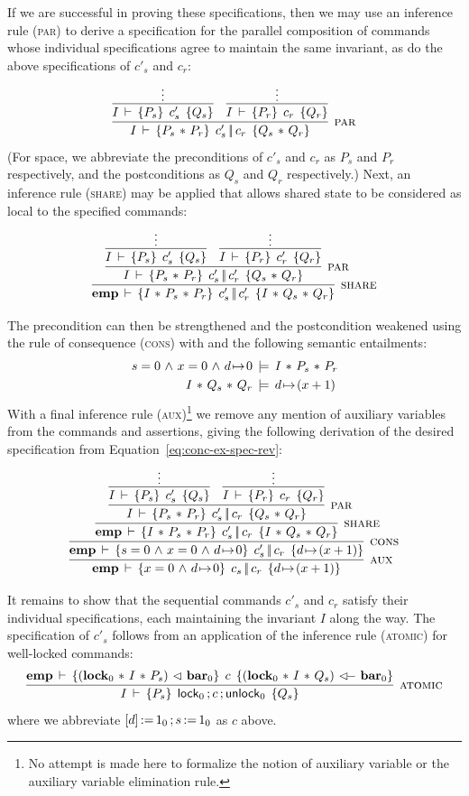 \documentclass[11pt]{report}
\begin{document}
If we are successful in proving these specifications, then we may use an inference rule (\textsc{par}) to derive a specification for the parallel composition of commands whose individual specifications agree to maintain the same invariant, as do the above specifications of $c'_s$ and $c_r$: \[ \infer[\textsc{par}]{\spec{I}{P_s \fsep P_r}{c'_s \oppar c_r}{Q_s \fsep Q_r}}{ \infer{\spec{I}{P_s}{c'_s}{Q_s}}{\vdots} & \infer{\spec{I}{P_r}{c_r}{Q_r}}{\vdots} }\] (For space, we abbreviate the preconditions of $c'_s$ and $c_r$ as $P_s$ and $P_r$ respectively, and the postconditions as $Q_s$ and $Q_r$ respectively.) Next, an inference rule (\textsc{share}) may be applied that allows shared state to be considered as local to the specified commands: \[ \infer[\textsc{share}]{ \spec{\femp}{I \fsep P_s \fsep P_r}{c'_s \oppar c'_r}{I \fsep Q_s \fsep Q_r} }{\infer[\textsc{par}]{\spec{I}{P_s \fsep P_r}{c'_s \oppar c'_r}{Q_s \fsep Q_r}}{ \infer{\spec{I}{P_s}{c'_s}{Q_s}}{\vdots} & \infer{\spec{I}{P_r}{c'_r}{Q_r}}{\vdots} }}\]

The precondition can then be strengthened and the postcondition weakened using the rule of consequence (\textsc{cons}) with and the following semantic entailments: \begin{align*}
s = 0 \operatorname{\,\wedge\,} x = 0 \operatorname{\,\wedge\,} d \!\mapsto\! 0 & \,\models\, I \operatorname{\,\ast\,} P_s \operatorname{\,\ast\,} P_r \\ 
I \operatorname{\,\ast\,} Q_s \operatorname{\,\ast\,} Q_r & \,\models\, d \!\mapsto\! (x + 1)
\end{align*} With a final inference rule (\textsc{aux})\footnote{No attempt is made here to formalize the notion of auxiliary variable or the auxiliary variable elimination rule.} we remove any mention of auxiliary variables from the commands and assertions, giving the following derivation of the desired specification from Equation~\ref{eq:conc-ex-spec-rev}: 
\[ \infer[\textsc{aux}]{ \spec{\femp}{x = 0 \conj d \fpointsto 0}{c_s \oppar c_r}{d \fpointsto (x+1)} }{\infer[\textsc{cons}]{ \spec{\femp}{s = 0 \conj x = 0 \conj d \fpointsto 0}{c'_s \oppar c_r}{d \fpointsto (x+1)} }{\infer[\textsc{share}]{ \spec{\femp}{I \fsep P_s \fsep P_r}{c'_s \oppar c_r}{I \fsep Q_s \fsep Q_r} }{\infer[\textsc{par}]{\spec{I}{P_s \fsep P_r}{c'_s \oppar c_r}{Q_s \fsep Q_r}}{ \infer{\spec{I}{P_s}{c'_s}{Q_s}}{\vdots} & \infer{\spec{I}{P_r}{c_r}{Q_r}}{\vdots} }}}}\]

It remains to show that the sequential commands $c'_s$ and $c_r$ satisfy their individual specifications, each maintaining the invariant $I$ along the way. The specification of $c'_s$ follows from an application of the inference rule (\textsc{atomic}) for well-locked commands: \[ \infer[\textsc{atomic}]{\spec{I}{P_s}{\clock_0 \opseq c \opseq \cunlock_0}{Q_s} }{\spec{\femp}{(\flock{0} \fsep I \fsep P_s) \fseq \fbar{0}}{c}{(\flock{0} \fsep I \fsep Q_s) \fseqri \fbar{0}}}\] where we abbreviate $\left[ d \right] \operatorname{:\!=} 1_0 \operatorname{;} s \operatorname{:\!=} 1_0$ as $c$ above. 
\end{document}
